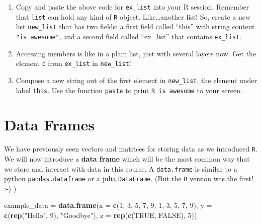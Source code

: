 \documentclass[]{book}
\newenvironment{Shaded}{\begin{snugshade}}{\end{snugshade}}
\newcommand{\KeywordTok}[1]{\textcolor[rgb]{0.13,0.29,0.53}{\textbf{#1}}}
\newcommand{\DataTypeTok}[1]{\textcolor[rgb]{0.13,0.29,0.53}{#1}}
\newcommand{\DecValTok}[1]{\textcolor[rgb]{0.00,0.00,0.81}{#1}}
\newcommand{\StringTok}[1]{\textcolor[rgb]{0.31,0.60,0.02}{#1}}
\newcommand{\OtherTok}[1]{\textcolor[rgb]{0.56,0.35,0.01}{#1}}
\newcommand{\NormalTok}[1]{#1}
\providecommand{\tightlist}{%
  \setlength{\itemsep}{0pt}\setlength{\parskip}{0pt}}
\begin{document}
\begin{enumerate}
\def\labelenumi{\arabic{enumi}.}
\tightlist
\item
  Copy and paste the above code for \texttt{ex\_list} into your R
  session. Remember that \texttt{list} can hold any kind of \texttt{R}
  object. Like\ldots{}another list! So, create a new list
  \texttt{new\_list} that has two fields: a first field called ``this''
  with string content \texttt{"is\ awesome"}, and a second field called
  ``ex\_list'' that contains \texttt{ex\_list}.
\item
  Accessing members is like in a plain list, just with several layers
  now. Get the element \texttt{c} from \texttt{ex\_list} in
  \texttt{new\_list}!
\item
  Compose a new string out of the first element in \texttt{new\_list},
  the element under label \texttt{this}. Use the function \texttt{paste}
  to print \texttt{R\ is\ awesome} to your screen.
\end{enumerate}

\section{Data Frames}\label{dataframes}

We have previously seen vectors and matrices for storing data as we
introduced \texttt{R}. We will now introduce a \textbf{data frame} which
will be the most common way that we store and interact with data in this
course. A \texttt{data.frame} is similar to a python
\texttt{pandas.dataframe} or a julia \texttt{DataFrame}. (But the
\texttt{R} version was the first! :-) )

\begin{Shaded}
\begin{Highlighting}[]
\NormalTok{example_data =}\StringTok{ }\KeywordTok{data.frame}\NormalTok{(}\DataTypeTok{x =} \KeywordTok{c}\NormalTok{(}\DecValTok{1}\NormalTok{, }\DecValTok{3}\NormalTok{, }\DecValTok{5}\NormalTok{, }\DecValTok{7}\NormalTok{, }\DecValTok{9}\NormalTok{, }\DecValTok{1}\NormalTok{, }\DecValTok{3}\NormalTok{, }\DecValTok{5}\NormalTok{, }\DecValTok{7}\NormalTok{, }\DecValTok{9}\NormalTok{),}
                          \DataTypeTok{y =} \KeywordTok{c}\NormalTok{(}\KeywordTok{rep}\NormalTok{(}\StringTok{"Hello"}\NormalTok{, }\DecValTok{9}\NormalTok{), }\StringTok{"Goodbye"}\NormalTok{),}
                          \DataTypeTok{z =} \KeywordTok{rep}\NormalTok{(}\KeywordTok{c}\NormalTok{(}\OtherTok{TRUE}\NormalTok{, }\OtherTok{FALSE}\NormalTok{), }\DecValTok{5}\NormalTok{))}
\end{Highlighting}
\end{Shaded}
\end{document}
